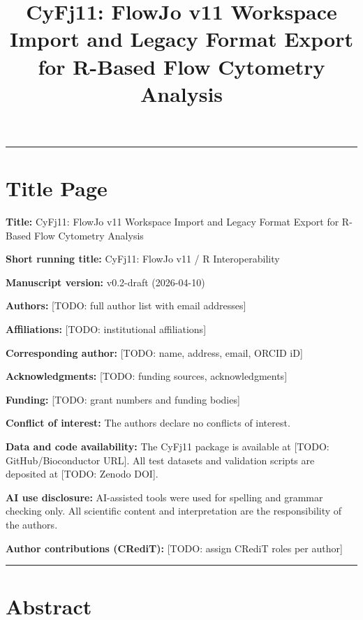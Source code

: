 \documentclass[
]{article}
\title{CyFj11: FlowJo v11 Workspace Import and Legacy Format Export for
R-Based Flow Cytometry Analysis}
\author{}
\date{\vspace{-2.5em}}
\begin{document}
\maketitle

\begin{center}\rule{0.5\linewidth}{0.5pt}\end{center}

\section{Title Page}\label{title-page}

\textbf{Title:} CyFj11: FlowJo v11 Workspace Import and Legacy Format
Export for R-Based Flow Cytometry Analysis

\textbf{Short running title:} CyFj11: FlowJo v11 / R Interoperability

\textbf{Manuscript version:} v0.2-draft (2026-04-10)

\textbf{Authors:} {[}TODO: full author list with email addresses{]}

\textbf{Affiliations:} {[}TODO: institutional affiliations{]}

\textbf{Corresponding author:} {[}TODO: name, address, email, ORCID
iD{]}

\textbf{Acknowledgments:} {[}TODO: funding sources, acknowledgments{]}

\textbf{Funding:} {[}TODO: grant numbers and funding bodies{]}

\textbf{Conflict of interest:} The authors declare no conflicts of
interest.

\textbf{Data and code availability:} The CyFj11 package is available at
\textcolor{pending}{[TODO: GitHub/Bioconductor URL]}. All test datasets
and validation scripts are deposited at
\textcolor{pending}{[TODO: Zenodo DOI]}.

\textbf{AI use disclosure:} AI-assisted tools were used for spelling and
grammar checking only. All scientific content and interpretation are the
responsibility of the authors.

\textbf{Author contributions (CRediT):} {[}TODO: assign CRediT roles per
author{]}

\begin{center}\rule{0.5\linewidth}{0.5pt}\end{center}

\section{Abstract}\label{abstract}
\end{document}
